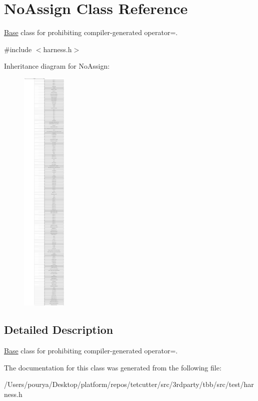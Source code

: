 \hypertarget{classNoAssign}{}\section{No\+Assign Class Reference}
\label{classNoAssign}


\hyperlink{structBase}{Base} class for prohibiting compiler-\/generated operator=.  




{\ttfamily \#include $<$harness.\+h$>$}

Inheritance diagram for No\+Assign\+:\begin{figure}[H]
\begin{center}
\leavevmode
\includegraphics[height=12.000000cm]{classNoAssign}
\end{center}
\end{figure}


\subsection{Detailed Description}
\hyperlink{structBase}{Base} class for prohibiting compiler-\/generated operator=. 

The documentation for this class was generated from the following file\+:\begin{DoxyCompactItemize}
\item 
/\+Users/pourya/\+Desktop/platform/repos/tetcutter/src/3rdparty/tbb/src/test/harness.\+h\end{DoxyCompactItemize}
